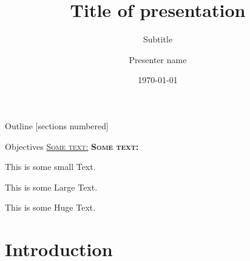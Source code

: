 \documentclass[14pt,xcolor=svgnames]{beamer} %
\title{Title of presentation}
\author[Short name]{Presenter name} %
\subtitle{Subtitle}
\institute[uni]{ School of XXXXXXX  \\ University of Westminster}
\date{\today} %
\begin{document}
{
\maketitle
}%


\begin{frame}{Outline}
[sections numbered] %
\tableofcontents[hideallsubsections] %
\end{frame}

\begin{frame}{Objectives}
\underline{\textsc{Some text:}}
\newline
\textbf{\textsc{Some text:}}
\begin{small}
This is some small Text. 
\end{small} 
\newline
\begin{Large}
	This is some Large Text. 
\end{Large}
\newline
\begin{Huge}
	This is some Huge Text. 
\end{Huge}

\end{frame}


\section{Introduction}
\end{document}
